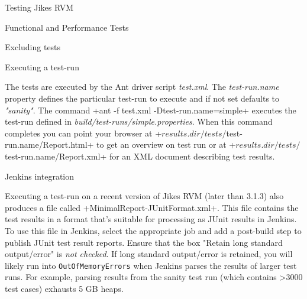 \begin{chapter}{Testing Jikes RVM}
\begin{section}{Functional and Performance Tests}
\begin{subsection}{Excluding tests}
\end{subsection}

\begin{subsection}{Executing a test-run}

The tests are executed by the Ant driver script \textit{test.xml}. The \textit{test-run.name} property defines the particular test-run to execute and if not set defaults to \textit{"sanity"}. The command \spverb+ant -f test.xml -Dtest-run.name=simple+ executes the test-run defined in \textit{build/test-runs/simple.properties}. When this command completes you can point your browser at \newline \spverb+${results.dir}/tests/${test-run.name}/Report.html+ to get an overview on test run or at \newline \spverb+${results.dir}/tests/${test-run.name}/Report.xml+ for an XML document describing test results.

\end{subsection}

\begin{subsection}{Jenkins integration}

Executing a test-run on a recent version of Jikes RVM (later than 3.1.3) also produces a file called \spverb+MinimalReport-JUnitFormat.xml+. This file contains the test results in a format that's suitable for processing as JUnit results in Jenkins. To use this file in Jenkins, select the appropriate job and add a post-build step to publish JUnit test result reports. Ensure that the box "Retain long standard output/error" is \textit{not checked}. If long standard output/error is retained, you will likely run into \texttt{Out\-Of\-Memory\-Errors} when Jenkins parses the results of larger test runs. For example, parsing results from the sanity test run (which contains \textgreater $3000$ test cases) exhausts 5 GB heaps.

\end{subsection}

\end{section}

\end{chapter}
